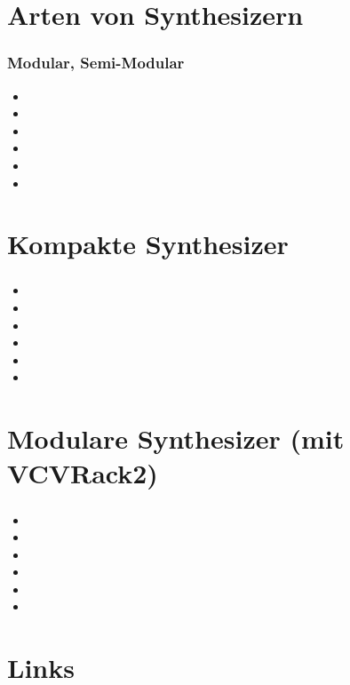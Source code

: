 \documentclass[11pt,ngerman]{beamer}
\begin{document}
\section{Arten von Synthesizern}
 
\begin{frame}
\frametitle{Modular, Semi-Modular}

\begin{itemize}
\item 
\item 
\item 
\item 
\item 
\item 
\end{itemize}
\end{frame}

\section{Kompakte Synthesizer}
 
\begin{frame}
\frametitle{}


\begin{itemize}
\item 
\item 
\item 
\item 
\item 
\item 
\end{itemize}
\end{frame}
 
\section{Modulare Synthesizer (mit VCVRack2)} 
 
\begin{frame}
\frametitle{}


\begin{itemize}
\item 
\item 
\item 
\item 
\item 
\item 
\end{itemize}
\end{frame} 
 
\section{Links} 
 
\end{document}
